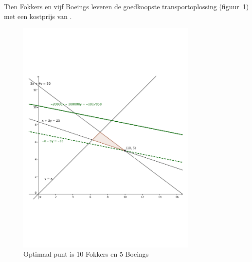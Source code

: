 \begin{Oplossing}{4.3}
    Tien Fokkers en vijf Boeings leveren de goedkoopste transportoplossing (figuur~\ref{fig:deptjaar}) met een kostprijs van .
              \begin{figure}[hbtp]
\centering
\includegraphics[width=0.8\textwidth]{oefeningen/FigurenLP/OefDepvhjaar.pdf}
\caption{Optimaal punt is 10 Fokkers en 5 Boeings}
\label{fig:deptjaar}
\end{figure}
    \clearpage
    
\end{Oplossing}
